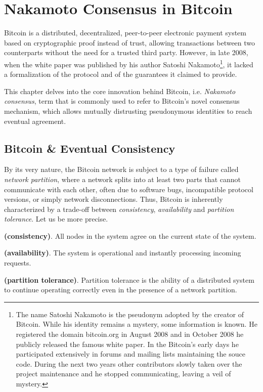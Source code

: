 \chapter{Nakamoto Consensus in Bitcoin}
\label{chpr:btc}
Bitcoin is a distributed, decentralized, peer-to-peer electronic payment system based on cryptographic proof instead of trust, allowing transactions between two counterparts without the need for a trusted third party. However, in late 2008, when the white paper was published by his author Satoshi Nakamoto\footnote{The name Satoshi Nakamoto is the pseudonym adopted by the creator of Bitcoin. While his identity remains a mystery, some information is known. He registered the domain bitcoin.org in August 2008 and in October 2008 he publicly released the famous white paper. In the Bitcoin's early days he participated extensively in forums and mailing lists maintaining the souce code. During the next two years other contributors slowly taken over the project maintenance and he stopped communicating, leaving a veil of mystery.}, it lacked a formalization of the protocol and of the guarantees it claimed to provide.

\bigskip
\noindent
This chapter delves into the core innovation behind Bitcoin, i.e. \textit{Nakamoto consensus}, term that is commonly used to refer to Bitcoin's novel consensus mechanism, which allows mutually distrusting pseudonymous identities to reach eventual agreement.

\bigskip
\section{Bitcoin \& Eventual Consistency}
By its very nature, the Bitcoin network is subject to a type of failure called \textit{network partition}, where a network splits into at least two parts that cannot communicate with each other, often due to software bugs, incompatible protocol versions, or simply network disconnections.
Thus, Bitcoin is inherently characterized by a trade-off between \textit{consistency}, \textit{availability} and \textit{partition tolerance}. Let us be more precise.
\begin{mydef} {\bf (consistency)}.
    All nodes in the system agree on the current state of the system.
\end{mydef}
\begin{mydef} {\bf (availability)}.
    The system is operational and instantly processing incoming requests.
\end{mydef}
\begin{mydef} {\bf (partition tolerance)}.
    Partition tolerance is the ability of a distributed system to continue operating correctly even in the presence of a network partition.
\end{mydef}

